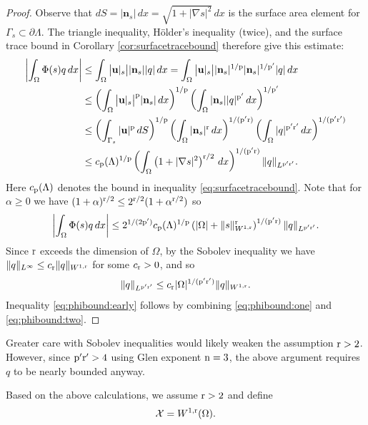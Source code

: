 \documentclass[hidelinks,onefignum,onetabnum,final]{siamart220329}  %
\newcommand{\grad}{\nabla}
\newcommand{\bn}{\mathbf{n}}
\newcommand{\bu}{\mathbf{u}}
\newcommand{\cX}{\mathcal{X}}
\newcommand{\nn}{{\text{\textnormal{n}}}}
\newcommand{\pp}{{\text{\textnormal{p}}}}
\newcommand{\rr}{{\text{\textnormal{r}}}}
\begin{document}
\begin{proof}  Observe that $dS = |\bn_s|\,dx = \sqrt{1+|\grad s|^2}\,dx$ is the surface area element for $\Gamma_s \subset \partial \Lambda$.  The triangle inequality, H\"older's inequality (twice), and the surface trace bound in Corollary \ref{cor:surfacetracebound} therefore give this estimate:
\begin{align}
\left|\int_\Omega \Phi(s) q\,dx\right| &\le \int_\Omega \big|\bu|_s\big| |\bn_s| |q|\,dx = \int_\Omega \big|\bu|_s\big| |\bn_s|^{1/\pp} |\bn_s|^{1/\pp'} |q|\,dx \label{eq:phibound:zero} \\
    &\le \left(\int_\Omega \big|\bu|_s\big|^\pp |\bn_s|\,dx\right)^{1/\pp} \left(\int_\Omega |\bn_s| |q|^{\pp'} \,dx\right)^{1/\pp'} \notag \\
    &\le \left(\int_{\Gamma_s} |\bu|^\pp \,dS\right)^{1/\pp} \left(\int_\Omega |\bn_s|^\rr \,dx\right)^{1/(\pp'\rr)} \left(\int_\Omega |q|^{\pp'\rr'} \,dx\right)^{1/(\pp'\rr')} \notag \\
    &\le c_\pp(\Lambda)^{1/\pp} \left(\int_\Omega \left(1+|\grad s|^2\right)^{\rr/2}\,dx\right)^{1/(\pp'\rr)} \|q\|_{L^{\pp'\rr'}}. \notag
\end{align}
Here $c_\pp(\Lambda)$ denotes the bound in inequality \eqref{eq:surfacetracebound}.  Note that for $\alpha\ge 0$ we have $(1+\alpha)^{\rr/2} \le 2^{\rr/2} (1+\alpha^{\rr/2})$ so
\begin{equation}
\left|\int_\Omega \Phi(s) q\,dx\right| \le 2^{1/(2\pp')} c_\pp(\Lambda)^{1/\pp} \left(|\Omega| + \|s\|_{W^{1,\rr}}^\rr\right)^{1/(\pp'\rr)} \|q\|_{L^{\pp'\rr'}}. \label{eq:phibound:one}
\end{equation}
Since $\rr$ exceeds the dimension of $\Omega$, by the Sobolev inequality \cite[Theorem 5.6.5]{Evans2010} we have $\|q\|_{L^\infty} \le c_\rr \|q\|_{W^{1,\rr}}$ for some $c_\rr>0$, and so
\begin{equation}
\|q\|_{L^{\pp'\rr'}} \le c_\rr |\Omega|^{1/(\pp'\rr')} \|q\|_{W^{1,\rr}}. \label{eq:phibound:two}
\end{equation}
Inequality \eqref{eq:phibound:early} follows by combining \eqref{eq:phibound:one} and \eqref{eq:phibound:two}.
\end{proof}

Greater care with Sobolev inequalities would likely weaken the assumption $\rr>2$.  However, since $\pp'\rr'>4$ using Glen exponent $\nn=3$, the above argument requires $q$ to be nearly bounded anyway.

Based on the above calculations, we assume $\rr>2$ and define
\begin{equation}
\cX = W^{1,\rr}(\Omega). \label{eq:defineX}
\end{equation}
\end{document}
